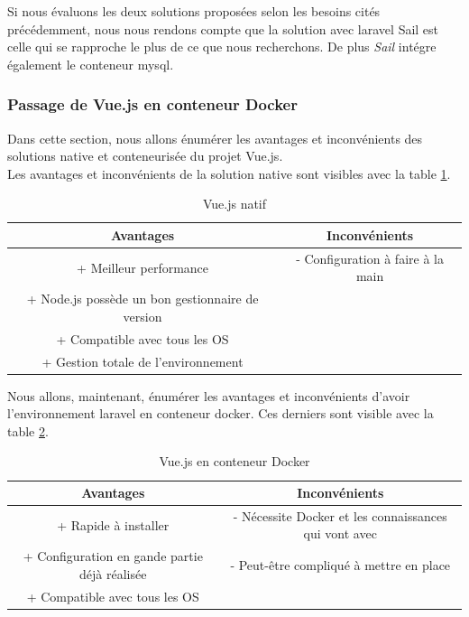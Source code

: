 \documentclass[
    iai, %
    il, %
]{heig-tb}
\begin{document}
Si nous évaluons les deux solutions proposées selon les besoins cités précédemment, nous nous rendons compte que la solution avec \Gls{laravel} Sail est celle qui se rapproche le plus de ce que nous recherchons. De plus \emph{Sail} intégre également le \Gls{conteneur} \Gls{mysql}.

\subsubsection{Passage de Vue.js en conteneur Docker}
Dans cette section, nous allons énumérer les avantages et inconvénients des solutions native et conteneurisée du projet Vue.js. \\
Les avantages et inconvénients de la solution native sont visibles avec la table \ref{dev-vuejs-native}.

\begin{table}[h]
    \begin{center}
        \caption{Vue.js natif \label{dev-vuejs-native}}
        \begin{tabular}{c|c}
            Avantages                                        & Inconvénients                     \\ \hline
            + Meilleur performance                           & - Configuration à faire à la main \\
            + Node.js possède un bon gestionnaire de version &                                   \\
            + Compatible avec tous les OS                    &                                   \\
            + Gestion totale de l'environnement              &                                   \\
        \end{tabular}
    \end{center}
\end{table}

Nous allons, maintenant, énumérer les avantages et inconvénients d'avoir l'environnement \Gls{laravel} en
\Gls{conteneur} \Gls{docker}. Ces derniers sont visible avec la table \ref{dev-vuejs-docker}.

\begin{table}[h]
    \begin{center}
        \caption{Vue.js en conteneur Docker \label{dev-vuejs-docker}}
        \begin{tabular}{c|c}
            Avantages                                     & Inconvénients                                         \\ \hline
            + Rapide à installer                          & - Nécessite Docker et les connaissances qui vont avec \\
            + Configuration en gande partie déjà réalisée & - Peut-être compliqué à mettre en place               \\
            + Compatible avec tous les OS                 &                                                       \\
        \end{tabular}
    \end{center}
\end{table}
\end{document}
